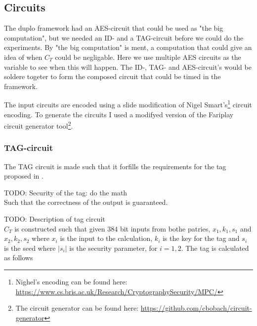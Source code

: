 \documentclass[10pt,a4paper]{article}
\newcommand{\todo}[1]{}
\renewcommand{\todo}[1]{{\color{red} TODO: {#1}} \\}
\begin{document}
\subsection{Circuits}
The duplo framework had an AES-circuit that could be used as "the big computation", but we needed an ID- and a TAG-circuit before we could do the experiments. By "the big computation" is ment, a computation that could give an idea of when $C_{T}$ could be negligable. Here we use multiple AES circuits as the variable to see when this will happen. The ID-, TAG- and AES-circuit's would be soldere togeter to form the composed circuit that could be timed in the framework.

\bigskip
The input circuits are encoded using a slide modification of Nigel Smart's\footnote{Nighel's encoding can be found here: \url{https://www.cs.bris.ac.uk/Research/CryptographySecurity/MPC/}} circuit encoding. To generate the circuits I used a modifyed version of the Fariplay circuit generator tool\footnote{The circuit generator can be found here: \url{https://github.com/cbobach/circuit-generator}}.

\subsubsection{TAG-circuit}
The TAG circuit is made such that it forfills the requirements for the tag proposed in \cite{fosc}.

\todo{Security of the tag: do the math}
Such that the correctness of the output is guaranteed.

\todo{Description of tag circuit}
$C_T$ is constructed such that given 384 bit inputs from bothe patries, $x_1, k_1, s_1$ and $x_2, k_2, s_2$ where $x_i$ is the input to the calculation, $k_i$ is the key for the tag and $s_i$ is the seed where $|s_i|$ is the security parameter, for $i=1,2$. The tag is calculated as follows 
\end{document}
